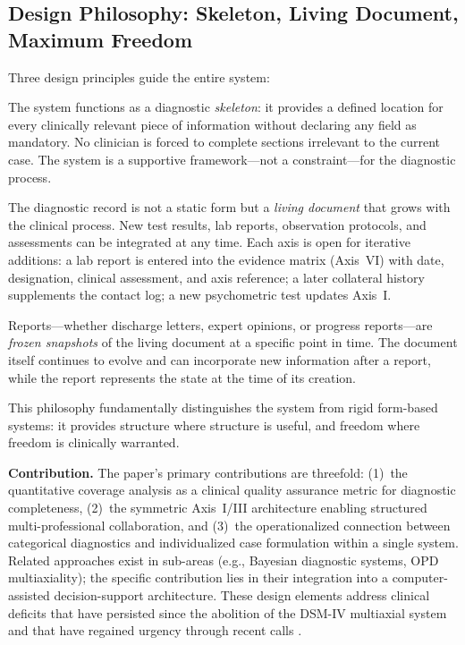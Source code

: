 \documentclass[11pt,a4paper]{article}
\begin{document}
\subsection{Design Philosophy: Skeleton, Living Document, Maximum Freedom}
\label{sec:designphilosophy}

Three design principles guide the entire system:

\begin{description}[style=nextline, leftmargin=1.5cm, font=\bfseries]
\item[Skeleton Principle] The system functions as a diagnostic \textit{skeleton}: it provides a defined location for every clinically relevant piece of information without declaring any field as mandatory. No clinician is forced to complete sections irrelevant to the current case. The system is a supportive framework---not a constraint---for the diagnostic process.
\item[Living Document] The diagnostic record is not a static form but a \textit{living document} that grows with the clinical process. New test results, lab reports, observation protocols, and assessments can be integrated at any time. Each axis is open for iterative additions: a lab report is entered into the evidence matrix (Axis~VI) with date, designation, clinical assessment, and axis reference; a later collateral history supplements the contact log; a new psychometric test updates Axis~I.
\item[Report as Snapshot] Reports---whether discharge letters, expert opinions, or progress reports---are \textit{frozen snapshots} of the living document at a specific point in time. The document itself continues to evolve and can incorporate new information after a report, while the report represents the state at the time of its creation.
\end{description}

This philosophy fundamentally distinguishes the system from rigid form-based systems: it provides structure where structure is useful, and freedom where freedom is clinically warranted.

\textbf{Contribution.} The paper's primary contributions are threefold: (1)~the quantitative coverage analysis as a clinical quality assurance metric for diagnostic completeness, (2)~the symmetric Axis~I/III architecture enabling structured multi-professional collaboration, and (3)~the operationalized connection between categorical diagnostics and individualized case formulation within a single system. Related approaches exist in sub-areas (e.g., Bayesian diagnostic systems, OPD multiaxiality); the specific contribution lies in their integration into a computer-assisted decision-support architecture. These design elements address clinical deficits that have persisted since the abolition of the DSM-IV multiaxial system and that have regained urgency through recent calls \citep{ErlichFirst2025}.
\end{document}
